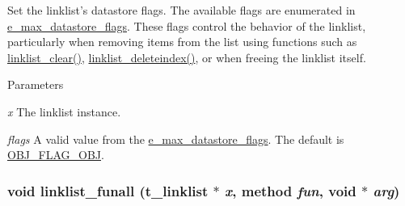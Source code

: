 Set the linklist's datastore flags. The available flags are enumerated in \hyperlink{group__datastore_gaa858d4b3815076d79624c39d9ca59348}{e\_\-max\_\-datastore\_\-flags}. These flags control the behavior of the linklist, particularly when removing items from the list using functions such as \hyperlink{group__linklist_ga551da85a8531e5785a4b748d8a86301a}{linklist\_\-clear()}, \hyperlink{group__linklist_ga8a93071a90ca14ed02a32fa09f9e13f9}{linklist\_\-deleteindex()}, or when freeing the linklist itself.


\begin{DoxyParams}{Parameters}
\item[{\em x}]The linklist instance. \item[{\em flags}]A valid value from the \hyperlink{group__datastore_gaa858d4b3815076d79624c39d9ca59348}{e\_\-max\_\-datastore\_\-flags}. The default is \hyperlink{group__datastore_ggaa858d4b3815076d79624c39d9ca59348adc630c58c8e958a404553a08db6fd180}{OBJ\_\-FLAG\_\-OBJ}. \end{DoxyParams}
\hypertarget{group__linklist_ga6f4496ef6dc1d6d121acf25d7cd5f946}{
\subsubsection[{linklist\_\-funall}]{\setlength{\rightskip}{0pt plus 5cm}void linklist\_\-funall ({\bf t\_\-linklist} $\ast$ {\em x}, \/  {\bf method} {\em fun}, \/  void $\ast$ {\em arg})}}
\label{group__linklist_ga6f4496ef6dc1d6d121acf25d7cd5f946}


